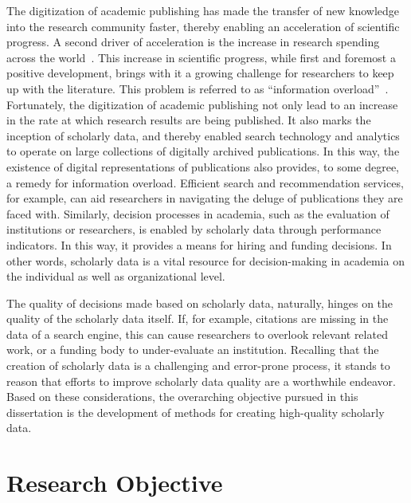 The digitization of academic publishing has made the transfer of new knowledge into the research community faster, thereby enabling an acceleration of scientific progress. A second driver of acceleration is the increase in research spending across the world~\cite{CRS2022,OECD2023}.
This increase in scientific progress, while first and foremost a positive development, brings with it a growing challenge for researchers to keep up with the literature. This problem is referred to as ``information overload''~\cite{Landhuis2016}.
Fortunately, the digitization of academic publishing not only lead to %
an increase in the rate at which research results are being published. It also marks the inception of scholarly data, and thereby enabled search technology and analytics to operate on large collections of digitally archived publications.
In this way, the existence of digital representations of publications also provides, to some degree, a remedy for information overload. Efficient search and recommendation services, for example, can aid researchers in navigating the deluge of publications they are faced with.
Similarly, decision processes in academia, such as the evaluation of institutions or researchers, is enabled by scholarly data through performance indicators. In this way, it provides a means for hiring and funding decisions.
In other words, scholarly data is a vital resource for decision-making in academia on the individual as well as organizational level.

The quality of decisions made based on scholarly data, naturally, hinges on the quality of the scholarly data itself. If, for example, citations are missing in the data of a search engine, this can cause researchers to overlook relevant related work, or a funding body to under-evaluate an institution. Recalling that the creation of scholarly data is a challenging and error-prone process, it stands to reason that efforts to improve scholarly data quality are a worthwhile endeavor. Based on these considerations, the overarching objective pursued in this dissertation is the development of methods for creating high-quality scholarly data.


\section{Research Objective}\label{sec:intro-researchobj}

